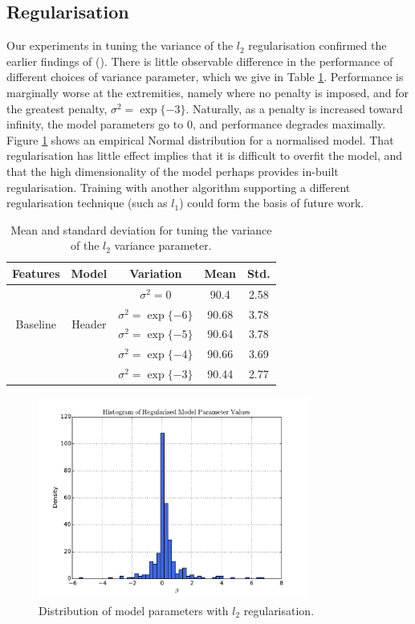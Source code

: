 \subsection{Regularisation}

Our experiments in tuning the variance of the $l_2$ regularisation confirmed the earlier findings of (\cite{Peng04accurateinformation}). There is little observable difference in the performance of different choices of variance parameter, which we give in Table \ref{table:regularisationresults}. Performance is marginally worse at the extremities, namely where no penalty is imposed, and for the greatest penalty, $\sigma^2 = \exp\{-3\}$. Naturally, as a penalty is increased toward infinity, the model parameters go to 0, and performance degrades maximally. Figure \ref{fig:histogram} shows an empirical Normal distribution for a normalised model. That regularisation has little effect implies that it is difficult to overfit the model, and that the high dimensionality of the model perhaps provides in-built regularisation. Training with another algorithm supporting a different regularisation technique (such as $l_1$) could form the basis of future work.

\begin{table}[h]
\begin{center}
\begin{tabular}{|c|c|c|c|c|}
\hline
Features & Model & Variation & Mean & Std.\\
\hline
\multirow{4}{*}{Baseline} & \multirow{4}{*}{Header} & $\sigma^2 = 0$ & 90.4 & 2.58\\
& & $\sigma^2 = \exp\{-6\}$ & 90.68 & 3.78\\
& & $\sigma^2 = \exp\{-5\}$ & 90.64 & 3.78\\
& & $\sigma^2 = \exp\{-4\}$ & 90.66 & 3.69\\
& & $\sigma^2 = \exp\{-3\}$ & 90.44 & 2.77\\
\hline
\end{tabular}
\caption[Mean and standard deviation for tuning the variance of the $l_2$ variance parameter.]{Mean and standard deviation for tuning the variance of the $l_2$ variance parameter.}
\label{table:regularisationresults}
\end{center}
\end{table}

\begin{figure}[h]
\center
\includegraphics[width=3.5in]{Figures/histogram.pdf}
\caption{Distribution of model parameters with $l_2$ regularisation.}
\label{fig:histogram}
\end{figure}

